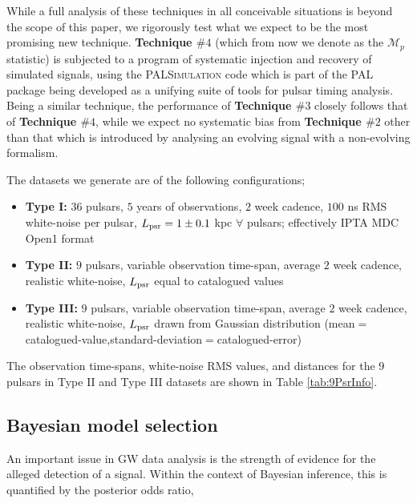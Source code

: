 \documentclass[prd,showpacs,nofootinbib]{revtex4}
\begin{document}
While a full analysis of these techniques in all conceivable situations is beyond the scope of this paper, we rigorously test what we expect to be the most promising new technique. {\bf Technique $\#4$} (which from now we denote as the {\bf $\mathcal{M}_p$} statistic) is subjected to a program of systematic injection and recovery of simulated signals, using the \textsc{PALSimulation} code which is part of the \textsc{PAL} package \citep{PAL-site} being developed as a unifying suite of tools for pulsar timing analysis. Being a similar technique, the performance of {\bf Technique $\#3$} closely follows that of {\bf Technique $\#4$}, while we expect no systematic bias from {\bf Technique $\#2$} other than that which is introduced by analysing an evolving signal with a non-evolving formalism.

The datasets we generate are of the following configurations;

\begin{itemize}

\item {\bf Type I:} $36$ pulsars, $5$ years of observations, $2$ week cadence, $100$ ns RMS white-noise per pulsar, $L_{\rm psr}=1\pm0.1$ kpc $\forall$ pulsars; effectively IPTA MDC Open1 format

\item {\bf Type II:} $9$ pulsars, variable observation time-span, average $2$ week cadence, realistic white-noise, $L_{\rm psr}$ equal to catalogued values

\item {\bf Type III:} $9$ pulsars, variable observation time-span, average $2$ week cadence, realistic white-noise, $L_{\rm psr}$ drawn from Gaussian distribution (mean$=$catalogued-value,standard-deviation$=$catalogued-error)

\end{itemize}

The observation time-spans, white-noise RMS values, and distances for the $9$ pulsars in Type II and Type III datasets are shown in Table \ref{tab:9PsrInfo}.

\subsection{Bayesian model selection}

An important issue in GW data analysis is the strength of evidence for the alleged detection of a signal. Within the context of Bayesian inference, this is quantified by the posterior odds ratio,
\end{document}
